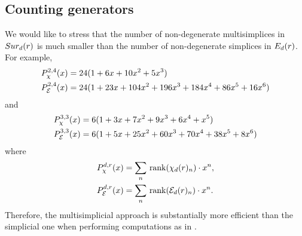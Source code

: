 
\subsection{Counting generators}

We would like to stress that the number of non-degenerate multisimplices in $Sur_d(r)$ is much smaller than the number of non-degenerate simplices in $E_d(r)$.
For example,
\begin{align*}
	& P_\chi^{2,4}(x) = 24(1+6x+10x^2+5x^3) \\
	& P_{\mathcal{E}}^{2,4}(x) = 24(1+23x+104x^2+196x^3+184x^4+86x^5+16x^6)
\end{align*}
and
\begin{align*}
	& P_\chi^{3,3}(x) = 6(1+3x+7x^2+9x^3+6x^4+x^5) \\
	& P_{\mathcal{E}}^{3,3}(x) = 6(1+5x+25x^2+60x^3+70x^4+38x^5+8x^6 )
\end{align*}
where
\begin{align*}
	P_\chi^{d,r}(x) &= \sum_n \,\operatorname{rank}(\chi_d(r)_n) \cdot x^n, \\
	P_{\mathcal{E}}^{d,r}(x)  &= \sum_n \,\operatorname{rank}(\mathcal{E}_d(r)_n)  \cdot x^n.
\end{align*}
Therefore, the multisimplicial approach is substantially more efficient than the simplicial
one when performing computations as in \cite{salvatore2020planarnonformality}.